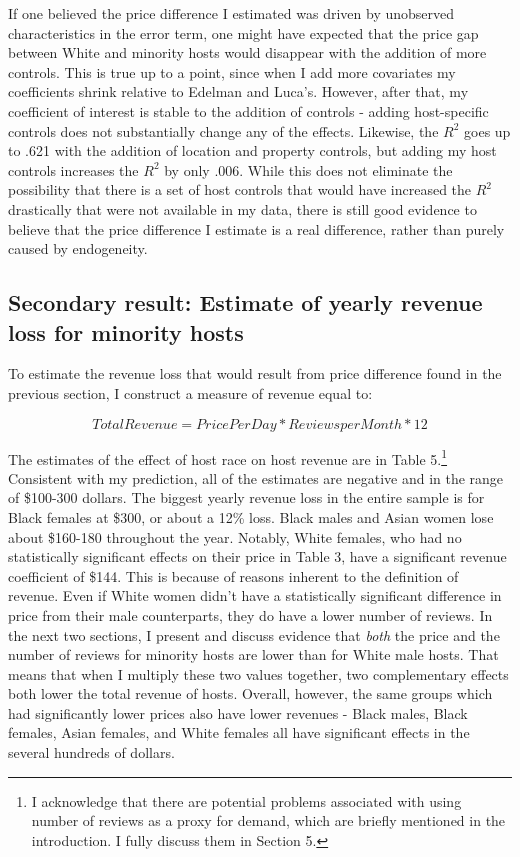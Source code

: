 \documentclass[11pt, oneside]{article}
\begin{document}
If one believed the price difference I estimated was driven by unobserved characteristics in the error term, one might have expected that the price gap between White and minority hosts would disappear with the addition of more controls. This is true up to a point, since when I add more covariates my coefficients shrink relative to Edelman and Luca's. However, after that, my coefficient of interest is stable to the addition of controls - adding host-specific controls does not substantially change any of the effects. Likewise, the $R^2$ goes up to .621 with the addition of location and property controls, but adding my host controls increases the $R^2$ by only .006. While this does not eliminate the possibility that there is a set of host controls that would have increased the $R^2$ drastically that were not available in my data, there is still good evidence to believe that the price difference I estimate is a real difference, rather than purely caused by endogeneity. 


\subsection{Secondary result: Estimate of yearly revenue loss for minority hosts}

To estimate the revenue loss that would result from price difference found in the previous section, I construct a measure of revenue equal to: 

\[Total Revenue = Price Per Day * Reviews per Month * 12\]

The estimates of the effect of host race on host revenue are in Table 5.\footnote{I acknowledge that there are potential problems associated with using number of reviews as a proxy for demand, which are briefly mentioned in the introduction. I fully discuss them in Section 5.} Consistent with my prediction, all of the estimates are negative and in the range of \$100-300 dollars. The biggest yearly revenue loss in the entire sample is for Black females at \$300, or about a 12\% loss. Black males and Asian women lose about \$160-180 throughout the year. Notably, White females, who had no statistically significant effects on their price in Table 3, have a significant revenue coefficient of \$144. This is because of reasons inherent to the definition of revenue. Even if White women didn't have a statistically significant difference in price from their male counterparts, they do have a lower number of reviews. In the next two sections, I present and discuss evidence that \textit{both} the price and the number of reviews for minority hosts are lower than for White male hosts. That means that when I multiply these two values together, two complementary effects both lower the total revenue of hosts. Overall, however, the same groups which had significantly lower prices also have lower revenues - Black males, Black females, Asian females, and White females all have significant effects in the several hundreds of dollars. 
 
\end{document}
